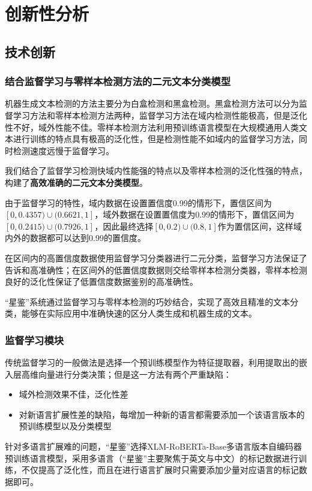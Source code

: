 \documentclass[a4paper]{report}
\begin{document}
\chapter{创新性分析}
\section{技术创新}
\subsection{结合监督学习与零样本检测方法的二元文本分类模型}
机器生成文本检测的方法主要分为白盒检测和黑盒检测。黑盒检测方法可以分为监督学习方法和零样本检测方法两种，监督学习方法在域内检测性能极高，但是泛化性不好，域外性能不佳。零样本检测方法利用预训练语言模型在大规模通用人类文本进行训练的特点具有极高的泛化性，但是检测性能不如域内的监督学习方法，同时检测速度远慢于监督学习。

我们结合了监督学习检测快域内性能强的特点以及零样本检测的泛化性强的特点，构建了\textbf{高效准确的二元文本分类模型}。

由于监督学习的特性，域内数据在设置置信度0.99的情形下，置信区间为 $[0, 0.4357)\cup(0.6621, 1]$，域外数据在设置置信度为0.99的情形下，置信区间为 $[0, 0.2415) \cup(0.7926, 1]$，因此最终选择$[0,0.2)\cup(0.8,1]$作为置信区间，这样域内外的数据都可以达到0.99的置信度。

在区间内的高置信度数据使用监督学习分类器进行二元分类，监督学习方法保证了告诉和高准确性；在区间外的低置信度数据则交给零样本检测分类器，零样本检测良好的泛化性保证了低置信度数据鉴别的高准确性。

“星鉴”系统通过监督学习与零样本检测的巧妙结合，实现了高效且精准的文本分类，能够在实际应用中准确快速的区分人类生成和机器生成的文本。

\subsection{监督学习模块}
传统监督学习的一般做法是选择一个预训练模型作为特征提取器，利用提取出的嵌入层高维向量进行分类决策；但是这一方法有两个严重缺陷：
\begin{itemize}
	\item 域外检测效果不佳，泛化性差
	\item 对新语言扩展性差的缺陷，每增加一种新的语言都需要添加一个该语言版本的预训练模型以及分类模型
\end{itemize}

针对多语言扩展难的问题，“星鉴”选择XLM-RoBERTa-Base多语言版本自编码器预训练语言模型，采用多语言（“星鉴”主要聚焦于英文与中文）的标记数据进行训练，不仅提高了泛化性，而且在进行语言扩展时只需要添加少量对应语言的标记数据即可。
\end{document}
